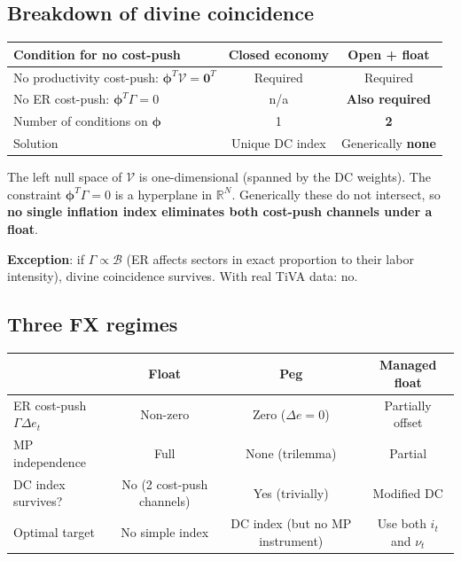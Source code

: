 \documentclass[11pt]{article}
\begin{document}
\subsection{Breakdown of divine coincidence}

\begin{center}
\begin{tabular}{lcc}
\toprule
\textbf{Condition for no cost-push} & \textbf{Closed economy} & \textbf{Open + float}\\
\midrule
No productivity cost-push: $\boldsymbol\phi^T\mathcal{V} = \mathbf{0}^T$ & Required & Required\\
No ER cost-push: $\boldsymbol\phi^T\Gamma = 0$ & n/a & \textbf{Also required}\\
\midrule
Number of conditions on $\boldsymbol\phi$ & 1 & \textbf{2}\\
Solution & Unique DC index & Generically \textbf{none}\\
\bottomrule
\end{tabular}
\end{center}

The left null space of $\mathcal{V}$ is one-dimensional (spanned by the DC weights).
The constraint $\boldsymbol\phi^T\Gamma=0$ is a hyperplane in $\mathbb{R}^N$.
Generically these do not intersect, so \textbf{no single inflation index eliminates
both cost-push channels under a float}.

\textbf{Exception}: if $\Gamma \propto \mathcal{B}$ (ER affects sectors in exact proportion
to their labor intensity), divine coincidence survives. With real TiVA data: no.

\subsection{Three FX regimes}

\begin{center}
\renewcommand{\arraystretch}{1.3}
\begin{tabular}{lccc}
\toprule
 & \textbf{Float} & \textbf{Peg} & \textbf{Managed float}\\
\midrule
ER cost-push $\Gamma\Delta e_t$ & Non-zero & Zero ($\Delta e=0$) & Partially offset\\
MP independence & Full & None (trilemma) & Partial\\
DC index survives? & No (2 cost-push channels) & Yes (trivially) & Modified DC\\
Optimal target & No simple index & DC index (but no MP instrument) & Use both $i_t$ and $\nu_t$\\
\bottomrule
\end{tabular}
\end{center}
\end{document}
